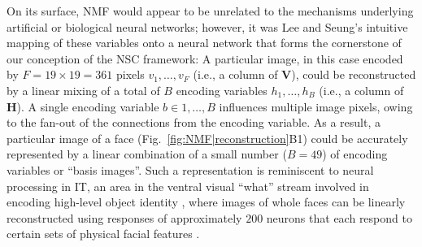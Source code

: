 On its surface, \ac{NMF} would appear to be unrelated to 
the mechanisms underlying 
artificial or biological neural networks;
however, it was Lee and Seung's intuitive mapping of these variables onto
a neural network that forms the cornerstone 
of our conception of the \ac{NSC} framework:
A particular image, in this case encoded by $F = 19 \times 19 = 361$ 
pixels $v_1, \ldots, v_F$
(i.e., a column of \textbf{V}),
could be reconstructed by a linear mixing of a total of $B$ encoding variables
$h_1, \ldots, h_B$ (i.e., a column of \textbf{H}).
A single encoding variable $b \in 1, \ldots, B$ 
influences multiple image pixels,
owing to the fan-out of the connections from the encoding variable.
As a result, a particular image of a face (Fig.~\ref{fig:NMF|reconstruction}B1)
could be accurately represented by a linear combination of 
a small number ($B = 49$) of encoding variables or ``basis images''.
Such a representation is reminiscent to neural processing in \ac{IT},
an area in the ventral visual ``what'' stream
involved in encoding high-level object identity
\citep{BrincatConnor2004,Majaj2015},
where images of whole faces can be linearly reconstructed
using responses of approximately $200$ neurons
that each respond to certain sets of physical facial features
\citep{ChangTsao2017}.

